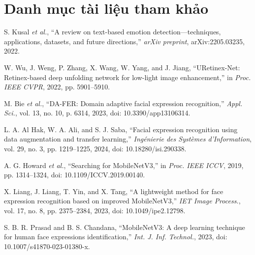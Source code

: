 \section{Danh mục tài liệu tham khảo} %

\begin{enumerate}[label={[{\arabic*}]}]
    \item S. Kusal \textit{et al.}, “A review on text-based emotion detection—techniques, applications, datasets, and future directions,” \textit{arXiv preprint}, arXiv:2205.03235, 2022.

    \item W. Wu, J. Weng, P. Zhang, X. Wang, W. Yang, and J. Jiang, “URetinex-Net: Retinex-based deep unfolding network for low-light image enhancement,” in \textit{Proc. IEEE CVPR}, 2022, pp. 5901–5910.

    \item M. Bie \textit{et al.}, “DA-FER: Domain adaptive facial expression recognition,” \textit{Appl. Sci.}, vol. 13, no. 10, p. 6314, 2023, doi: 10.3390/app13106314.

    \item L. A. Al Hak, W. A. Ali, and S. J. Saba, “Facial expression recognition using data augmentation and transfer learning,” \textit{Ingénierie des Systèmes d'Information}, vol. 29, no. 3, pp. 1219–1225, 2024, doi: 10.18280/isi.290338.

    \item A. G. Howard \textit{et al.}, “Searching for MobileNetV3,” in \textit{Proc. IEEE ICCV}, 2019, pp. 1314–1324, doi: 10.1109/ICCV.2019.00140.

    \item X. Liang, J. Liang, T. Yin, and X. Tang, “A lightweight method for face expression recognition based on improved MobileNetV3,” \textit{IET Image Process.}, vol. 17, no. 8, pp. 2375–2384, 2023, doi: 10.1049/ipe2.12798.

    \item S. B. R. Prasad and B. S. Chandana, “MobileNetV3: A deep learning technique for human face expressions identification,” \textit{Int. J. Inf. Technol.}, 2023, doi: 10.1007/s41870-023-01380-x.
\end{enumerate}